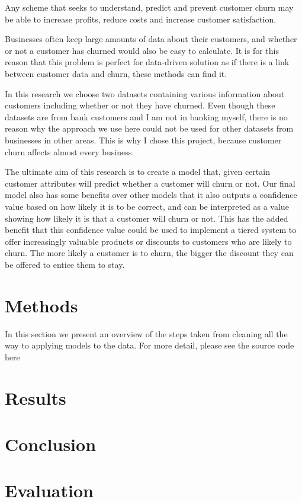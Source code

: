 \documentclass[]{article}
\begin{document}
Any scheme that seeks to understand, predict and prevent customer churn may be able to increase profits, reduce costs and increase customer satisfaction. 

Businesses often keep large amounts of data about their customers, and whether or not a customer has churned would also be easy to calculate. It is for this reason that this problem is perfect for data-driven solution as if there is a link between customer data and churn, these methods can find it.

In this research we choose two datasets containing various information about customers including whether or not they have churned. Even though these datasets are from bank customers and I am not in banking myself, there is no reason why the approach we use here could not be used for other datasets from businesses in other areas. This is why I chose this project, because customer churn affects almost every business. 

The ultimate aim of this research is to create a model that, given certain customer attributes will predict whether a customer will churn or not. Our final model also has some benefits over other models that it also outputs a confidence value based on how likely it is to be correct, and can be interpreted as a value showing how likely it is that a customer will churn or not. This has the added benefit that this confidence value could be used to implement a tiered system to offer increasingly valuable products or discounts to customers who are likely to churn. The more likely a customer is to churn, the bigger the discount they can be offered to entice them to stay.

\section{Methods}

In this section we present an overview of the steps taken from cleaning all the way to applying models to the data. For more detail, please see the source code here

\section{Results}

\section{Conclusion}

\section{Evaluation}
\end{document}
